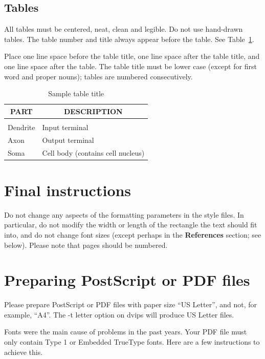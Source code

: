 \documentclass{article} %
\begin{document}
\subsection{Tables}

All tables must be centered, neat, clean and legible. Do not use hand-drawn
tables. The table number and title always appear before the table. See
Table~\ref{sample-table}.

Place one line space before the table title, one line space after the table
title, and one line space after the table. The table title must be lower case
(except for first word and proper nouns); tables are numbered consecutively.

\begin{table}[t]
\caption{Sample table title}
\label{sample-table}
\begin{center}
\begin{tabular}{ll}
\multicolumn{1}{c}{\bf PART}  &\multicolumn{1}{c}{\bf DESCRIPTION}
\\ \hline \\
Dendrite         &Input terminal \\
Axon             &Output terminal \\
Soma             &Cell body (contains cell nucleus) \\
\end{tabular}
\end{center}
\end{table}

\section{Final instructions}

Do not change any aspects of the formatting parameters in the style files.
In particular, do not modify the width or length of the rectangle the text
should fit into, and do not change font sizes (except perhaps in the
\textbf{References} section; see below). Please note that pages should be
numbered.

\section{Preparing PostScript or PDF files}

Please prepare PostScript or PDF files with paper size ``US Letter'', and
not, for example, ``A4''. The -t
letter option on dvips will produce US Letter files.

Fonts were the main cause of problems in the past years. Your PDF file must
only contain Type 1 or Embedded TrueType fonts. Here are a few instructions
to achieve this.
\end{document}
